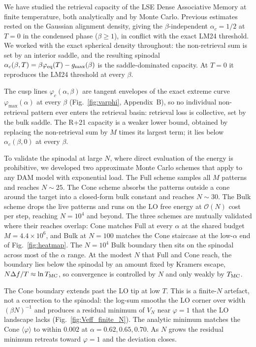 \documentclass[letterpaper]{article} %
\newcommand{\avg}[1]{\langle #1 \rangle}
\newcommand{\Bnet}{\beta}
\newcommand{\ac}{\alpha_c}
\begin{document}
We have studied the retrieval capacity of the LSE Dense Associative Memory at finite temperature, both analytically and by Monte Carlo. Previous estimates rested on the Gaussian alignment density, giving the $\Bnet$-independent $\ac = 1/2$ at $T = 0$ in the condensed phase ($\Bnet \geq 1$), in conflict with the exact LM24 threshold. We worked with the exact spherical density throughout: the non-retrieval sum is set by an interior saddle, and the resulting spinodal $\ac(\Bnet, T) = \Bnet \varphi_{\rm eq}(T) - g_{\max}(\Bnet)$ is the saddle-dominated capacity. At $T = 0$ it reproduces the LM24 threshold at every $\Bnet$.

The cusp lines $\varphi_c(\alpha, \Bnet)$ are tangent envelopes of the exact extreme curve $\varphi_{\max}(\alpha)$ at every $\Bnet$ (Fig.~\ref{fig:varphi}, Appendix~B), so no individual non-retrieval pattern ever enters the retrieval basin: retrieval loss is collective, set by the bulk saddle. The R+21 capacity is a weaker lower bound, obtained by replacing the non-retrieval sum by $M$ times its largest term; it lies below $\ac(\Bnet, 0)$ at every $\Bnet$.

To validate the spinodal at large $N$, where direct evaluation of the energy is prohibitive, we developed two approximate Monte Carlo schemes that apply to any DAM model with exponential load. The Full scheme samples all $M$ patterns and reaches $N \sim 25$. The Cone scheme absorbs the patterns outside a cone around the target into a closed-form bulk constant and reaches $N \sim 30$. The Bulk scheme drops the live patterns and runs on the LO free energy at $\mathcal{O}(N)$ cost per step, reaching $N = 10^4$ and beyond. The three schemes are mutually validated where their reaches overlap: Cone matches Full at every $\alpha$ at the shared budget $M = 4.4 \times 10^6$, and Bulk at $N = 100$ matches the Cone staircase at the low-$\alpha$ end of Fig.~\ref{fig:heatmap}. The $N = 10^4$ Bulk boundary then sits on the spinodal across most of the $\alpha$ range. At the modest $N$ that Full and Cone reach, the boundary lies below the spinodal by an amount fixed by Kramers escape, $N \Delta f / T \approx \ln T_{\rm MC}$, so convergence is controlled by $N$ and only weakly by $T_{\rm MC}$.

The Cone boundary extends past the LO tip at low $T$. This is a finite-$N$ artefact, not a correction to the spinodal: the log-sum smooths the LO corner over width $(\Bnet N)^{-1}$ and produces a residual minimum of $V_N$ near $\varphi = 1$ that the LO landscape lacks (Fig.~\ref{fig:Veff_finite_N}). The analytic minimum matches the Cone $\avg{\varphi}$ to within $0.002$ at $\alpha = 0.62, 0.65, 0.70$. As $N$ grows the residual minimum retreats toward $\varphi = 1$ and the deviation closes.
\end{document}
